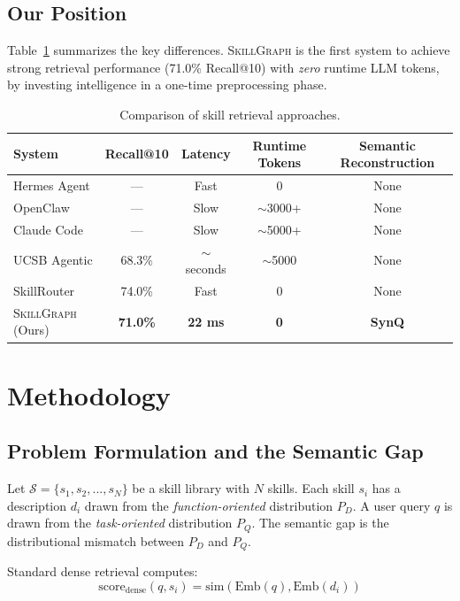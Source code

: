 \documentclass[11pt,a4paper]{article}
\newcommand{\ours}{\textsc{SkillGraph}}
\newcommand{\ucsb}{\textsc{UCSB}}
\begin{document}
\subsection{Our Position}

Table~\ref{tab:comparison} summarizes the key differences. \ours{} is the first system to achieve strong retrieval performance (71.0\% Recall@10) with \emph{zero} runtime LLM tokens, by investing intelligence in a one-time preprocessing phase.

\begin{table}[h]
\centering
\small
\caption{Comparison of skill retrieval approaches.}
\label{tab:comparison}
\begin{tabular}{@{}lcccc@{}}
\toprule
\textbf{System} & \textbf{Recall@10} & \textbf{Latency} & \textbf{Runtime Tokens} & \textbf{Semantic Reconstruction} \\
\midrule
Hermes Agent & --- & Fast & 0 & None \\
OpenClaw & --- & Slow & $\sim$3000+ & None \\
Claude Code & --- & Slow & $\sim$5000+ & None \\
\ucsb{} Agentic & 68.3\% & $\sim$seconds & $\sim$5000 & None \\
SkillRouter & 74.0\% & Fast & 0 & None \\
\midrule
\ours{} (Ours) & \textbf{71.0\%} & \textbf{22 ms} & \textbf{0} & \textbf{SynQ} \\
\bottomrule
\end{tabular}
\end{table}

\section{Methodology}
\label{sec:methodology}

\subsection{Problem Formulation and the Semantic Gap}

Let $\mathcal{S} = \{s_1, s_2, ..., s_N\}$ be a skill library with $N$ skills. Each skill $s_i$ has a description $d_i$ drawn from the \emph{function-oriented} distribution $P_D$. A user query $q$ is drawn from the \emph{task-oriented} distribution $P_Q$. The semantic gap is the distributional mismatch between $P_D$ and $P_Q$.

Standard dense retrieval computes:
\begin{equation}
\text{score}_{\text{dense}}(q, s_i) = \text{sim}(\text{Emb}(q), \text{Emb}(d_i))
\end{equation}
\end{document}
